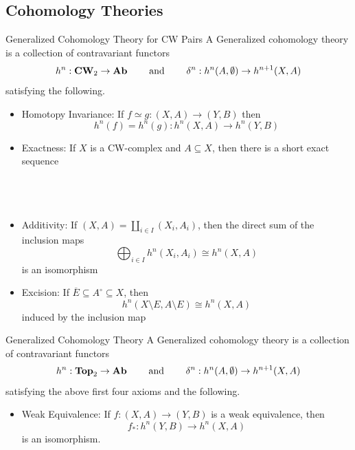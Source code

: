 \documentclass[a4paper]{article}
\begin{document}
\subsection{Cohomology Theories}
\begin{defn}{Generalized Cohomology Theory for CW Pairs}{} A Generalized cohomology theory is a collection of contravariant functors $$h^n:\bold{CW}_2\to\bold{Ab}\;\;\;\;\;\;\;\text{ and }\;\;\;\;\;\;\;\delta^n:h^n(A,\emptyset)\to h^{n+1}(X,A)$$ satisfying the following. 
\begin{itemize}
\item Homotopy Invariance: If $f\simeq g:(X,A)\to(Y,B)$ then $$h^n(f)=h^n(g):h^n(X,A)\to h^n(Y,B)$$
\item Exactness: If $X$ is a CW-complex and $A\subseteq X$, then there is a short exact sequence \\~\\
\\~\\
\item Additivity: If $(X,A)=\coprod_{i\in I}(X_i,A_i)$, then the direct sum of the inclusion maps $$\bigoplus_{i\in I}h^n(X_i,A_i)\cong h^n(X,A)$$ is an isomorphism
\item Excision: If $\overline{E}\subseteq A^\circ\subseteq X$, then $$h^n(X\setminus E,A\setminus E)\cong h^n(X,A)$$ induced by the inclusion map
\end{itemize}
\end{defn}

\begin{defn}{Generalized Cohomology Theory}{} A Generalized cohomology theory is a collection of contravariant functors $$h^n:\bold{Top}_2\to\bold{Ab}\;\;\;\;\;\;\;\text{ and }\;\;\;\;\;\;\;\delta^n:h^n(A,\emptyset)\to h^{n+1}(X,A)$$ satisfying the above first four axioms and the following. 
\begin{itemize}
\item Weak Equivalence: If $f:(X,A)\to(Y,B)$ is a weak equivalence, then $$f_\ast:h^n(Y,B)\to h^n(X,A)$$ is an isomorphism. 
\end{itemize}
\end{defn}
\end{document}
